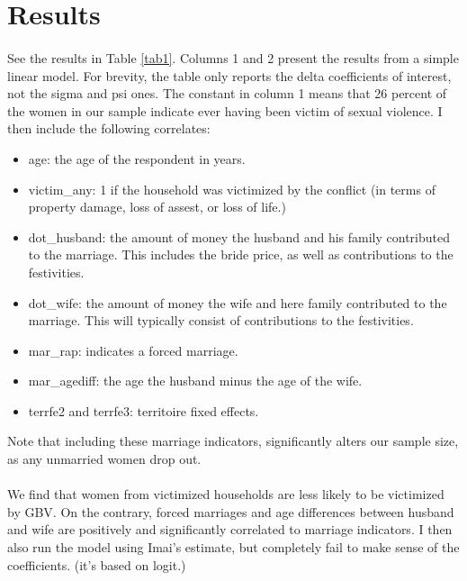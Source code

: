 \documentclass[11pt,a4paper]{scrartcl} %
\begin{document}


\section*{Results}
\paragraph{}
See the results in Table \ref{tab1}. Columns 1 and 2 present the results from a simple linear model. For brevity, the table only reports the delta coefficients of interest, not the sigma and psi ones. The constant in column 1 means that 26 percent of the women in our sample indicate ever having been victim of sexual violence. 
I then include the following correlates:
\begin{itemize}
	\item age: the age of the respondent in years.
	\item victim\_any: 1 if the household was victimized by the conflict (in terms of property damage, loss of assest, or loss of life.)
	\item dot\_husband: the amount of money the husband and his family contributed to the marriage. This includes the bride price, as well as contributions to the festivities.
	\item dot\_wife: the amount of money  the wife and here family contributed to the marriage. This will typically consist of contributions to the festivities.
	\item mar\_rap: indicates a forced marriage.
	\item mar\_agediff: the age the husband minus the age of the wife.
	\item terrfe2 and terrfe3: territoire fixed effects.
\end{itemize}

Note that including these marriage indicators, significantly alters our sample size, as any unmarried women drop out.

\paragraph{}
We find that women from victimized households are less likely to be victimized by GBV. On the contrary, forced marriages and age differences between husband and wife are positively and significantly correlated to marriage indicators. I then also run the model using Imai's estimate, but completely fail to make sense of the coefficients. (it's based on logit.)
\end{document}
